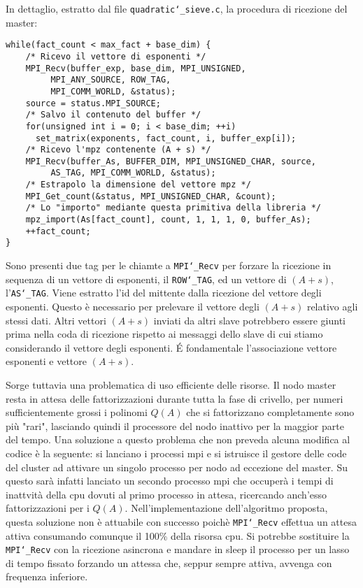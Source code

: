 In dettaglio, estratto dal file \texttt{quadratic\char`_sieve.c}, la procedura
di ricezione del master:
\begin{lstlisting}
while(fact_count < max_fact + base_dim) {
    /* Ricevo il vettore di esponenti */
    MPI_Recv(buffer_exp, base_dim, MPI_UNSIGNED,
	     MPI_ANY_SOURCE, ROW_TAG, 
	     MPI_COMM_WORLD, &status);
    source = status.MPI_SOURCE;
    /* Salvo il contenuto del buffer */
    for(unsigned int i = 0; i < base_dim; ++i) 
      set_matrix(exponents, fact_count, i, buffer_exp[i]);
    /* Ricevo l'mpz contenente (A + s) */
    MPI_Recv(buffer_As, BUFFER_DIM, MPI_UNSIGNED_CHAR, source, 
	     AS_TAG, MPI_COMM_WORLD, &status);
    /* Estrapolo la dimensione del vettore mpz */
    MPI_Get_count(&status, MPI_UNSIGNED_CHAR, &count);
    /* Lo "importo" mediante questa primitiva della libreria */
    mpz_import(As[fact_count], count, 1, 1, 1, 0, buffer_As);
    ++fact_count;
}
\end{lstlisting}
Sono presenti due tag per le chiamte a \texttt{MPI\char`_Recv} per forzare la
ricezione in sequenza di un vettore di esponenti, il \texttt{ROW\char`_TAG}, ed un
vettore di $(A + s)$, l'\texttt{AS\char`_TAG}. Viene estratto l'id del mittente dalla
ricezione del vettore degli esponenti. Questo è necessario per
prelevare il vettore degli $(A + s)$ relativo agli stessi dati. Altri
vettori $(A + s)$ inviati da altri slave potrebbero essere giunti
prima nella coda di ricezione rispetto ai messaggi dello slave
di cui stiamo considerando il vettore degli esponenti. \'E
fondamentale l'associazione vettore 
esponenti e vettore $(A + s)$.

Sorge tuttavia una problematica di uso efficiente delle risorse. Il
nodo master resta in attesa delle fattorizzazioni durante tutta la fase di
crivello, per numeri sufficientemente grossi i polinomi $Q(A)$ che si
fattorizzano completamente sono più "rari", lasciando quindi il processore del nodo
inattivo per la maggior parte del tempo. Una soluzione a questo
problema che non preveda alcuna modifica al codice è la seguente:
si lanciano i processi mpi e si istruisce il gestore delle code
del cluster ad attivare un singolo processo 
per nodo ad eccezione del master. Su questo sarà infatti lanciato un
secondo processo mpi che occuperà i tempi di inattvità della cpu
dovuti al primo processo in attesa, ricercando anch'esso
fattorizzazioni per i $Q(A)$. Nell'implementazione dell'algoritmo
proposta, questa soluzione non è
attuabile con  successo poichè \texttt{MPI\char`_Recv} effettua un attesa attiva
consumando comunque il 100\% della risorsa cpu. Si potrebbe sostituire
la \texttt{MPI\char`_Recv} con la ricezione asincrona e mandare in sleep il processo
per un lasso di tempo fissato forzando un attessa che, seppur sempre
attiva, avvenga con frequenza inferiore.
